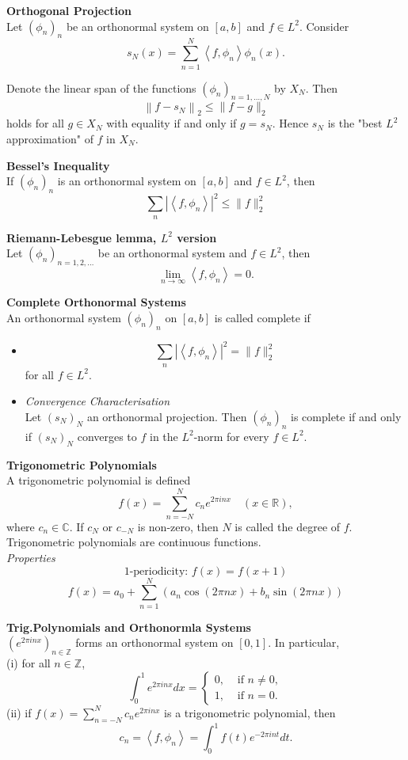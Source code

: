 \documentclass[a4paper, 10pt]{article}
\begin{document}
\begin{multicols*}{3}
\textbf{Orthogonal Projection}\\
Let $\left(\phi_n\right)_n$ be an orthonormal system on $[a, b]$ and $f \in L^2$. Consider
$$
s_N(x)=\sum_{n=1}^N\left\langle f, \phi_n\right\rangle \phi_n(x) .
$$

Denote the linear span of the functions $\left(\phi_n\right)_{n=1, \ldots, N}$ by $X_N$. Then
$$
\left\|f-s_N\right\|_2 \leq\|f-g\|_2
$$
holds for all $g \in X_N$ with equality if and only if $g=s_N$.
Hence $s_N$ is the "best $L^2$ approximation" of $f$ in $X_N$.

\textbf{Bessel's Inequality}\\
If $\left(\phi_n\right)_n$ is an orthonormal system on $[a, b]$ and $f \in L^2$, then
$$
\sum_n\left|\left\langle f, \phi_n\right\rangle\right|^2 \leq\|f\|_2^2
$$

\textbf{Riemann-Lebesgue lemma, $L^2$ version}\\
Let $\left(\phi_n\right)_{n=1,2, \ldots}$ be an orthonormal system and $f \in L^2$, then
$$
\lim _{n \rightarrow \infty}\left\langle f, \phi_n\right\rangle=0 .
$$

\textbf{Complete Orthonormal Systems}\\
An orthonormal system $\left(\phi_n\right)_n$ on $[a,b]$ is called complete if
\begin{itemize}[label=\textbullet, labelsep=0.3em, leftmargin=1em]
	\item
$$
\sum_n\left|\left\langle f, \phi_n\right\rangle\right|^2=\|f\|_2^2
$$
for all $f \in L^2$.

\item \textit{Convergence Characterisation}\\
Let $\left(s_N\right)_N$ an orthonormal projection. Then $\left(\phi_n\right)_n$ is complete if and only if $\left(s_N\right)_N$ converges to $f$ in the $L^2$-norm for every $f \in L^2$.

\end{itemize}
\textbf{Trigonometric Polynomials}\\
A trigonometric polynomial is defined
$$
f(x)=\sum_{n=-N}^N c_n e^{2 \pi i n x} \quad(x \in \mathbb{R}),
$$
where $c_n \in \mathbb{C}$. If $c_N$ or $c_{-N}$ is non-zero, then $N$ is called the degree of $f$.
Trigonometric polynomials are continuous functions.\\
\textit{Properties}
$$\text{1-periodicity: } f(x)=f(x+1)$$
$$f(x)=a_0+\sum_{n=1}^N\left(a_n \cos (2 \pi n x)+b_n \sin (2 \pi n x)\right)$$

\textbf{Trig.Polynomials and Orthonormla Systems}\\
$\left(e^{2 \pi i n x}\right)_{n \in \mathbb{Z}}$ forms an orthonormal system on $[0,1]$. In particular,\\
(i) for all $n \in \mathbb{Z}$,
$$
\int_0^1 e^{2 \pi i n x} d x= \begin{cases}0, & \text { if } n \neq 0, \\ 1, & \text { if } n=0 .\end{cases}
$$
(ii) if $f(x)=\sum_{n=-N}^N c_n e^{2 \pi i n x}$ is a trigonometric polynomial, then
$$
c_n=\left\langle f, \phi_n\right\rangle=\int_0^1 f(t) e^{-2 \pi i n t} d t .
$$


\end{multicols*}
\end{document}
